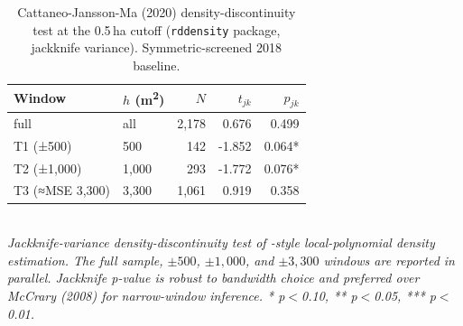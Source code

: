 \begin{table}[t]
\centering
\caption{Cattaneo-Jansson-Ma (2020) density-discontinuity test at the 0.5\,ha cutoff (\texttt{rddensity} package, jackknife variance). Symmetric-screened 2018 baseline.}
\label{tab:cjm_density_en}
\begin{tabular}{llrrr}
\toprule
Window & $h$ (m\textsuperscript{2}) & $N$ & $t_{jk}$ & $p_{jk}$ \\
\midrule
full & all & 2,178 & 0.676 & 0.499 \\
T1 (±500) & 500 & 142 & -1.852 & 0.064* \\
T2 (±1,000) & 1,000 & 293 & -1.772 & 0.076* \\
T3 (≈MSE 3,300) & 3,300 & 1,061 & 0.919 & 0.358 \\
\bottomrule
\end{tabular}
\\
\footnotesize\textit{Jackknife-variance density-discontinuity test of \citet{CalonicoCattaneoTitiunik2014_rdrobust}-style local-polynomial density estimation. The full sample, $\pm500$, $\pm 1{,}000$, and $\pm 3{,}300$ windows are reported in parallel. Jackknife p-value is robust to bandwidth choice and preferred over McCrary (2008) for narrow-window inference. * p$<$0.10, ** p$<$0.05, *** p$<$0.01.}
\end{table}
